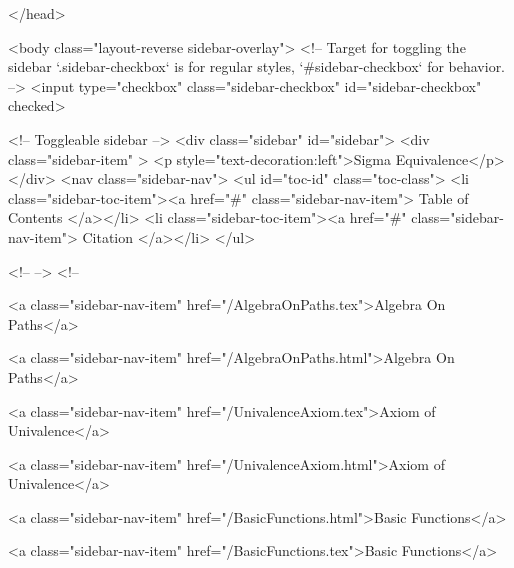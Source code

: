   
</head>




  <body class="layout-reverse sidebar-overlay">
    <!-- Target for toggling the sidebar `.sidebar-checkbox` is for regular
     styles, `#sidebar-checkbox` for behavior. -->
<input type="checkbox" class="sidebar-checkbox" id="sidebar-checkbox" checked>

<!-- Toggleable sidebar -->
<div class="sidebar" id="sidebar">
  <div class="sidebar-item" >
    <p style="text-decoration:left">Sigma Equivalence</p>
  </div>
  <nav class="sidebar-nav">
    <ul id="toc-id" class="toc-class">
  <li class="sidebar-toc-item"><a href="#" class="sidebar-nav-item"> Table of Contents </a></li>
  <li class="sidebar-toc-item"><a href="#" class="sidebar-nav-item"> Citation </a></li>
</ul>


    <!--  -->
    <!-- 
      
    
      
    
      
    
      
        
      
    
      
        
          <a class="sidebar-nav-item" href="/AlgebraOnPaths.tex">Algebra On Paths</a>
        
      
    
      
        
          <a class="sidebar-nav-item" href="/AlgebraOnPaths.html">Algebra On Paths</a>
        
      
    
      
        
          <a class="sidebar-nav-item" href="/UnivalenceAxiom.tex">Axiom of Univalence</a>
        
      
    
      
        
          <a class="sidebar-nav-item" href="/UnivalenceAxiom.html">Axiom of Univalence</a>
        
      
    
      
        
          <a class="sidebar-nav-item" href="/BasicFunctions.html">Basic Functions</a>
        
      
    
      
        
          <a class="sidebar-nav-item" href="/BasicFunctions.tex">Basic Functions</a>
        
      
    
